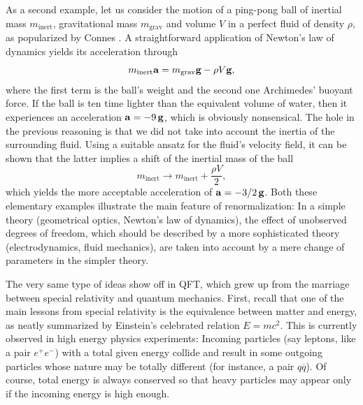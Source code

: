 \documentclass[10pt,here,feynmf]{article}
\begin{document}
As a second example, let us consider the motion of a ping-pong ball of inertial mass $m_{\mathrm{inert}}$, gravitational mass $m_{\mathrm{grav}}$ and volume $V$ in a perfect fluid of density $\rho$, as popularized by Connes \cite{connesmarcolli}. A straightforward application of Newton's law of dynamics yields its acceleration through 
\begin{equation} 
m_{\mathrm{inert}}{\bf a}=m_{\mathrm{grav}}{\bf g}-\rho V{\bf g},
\end{equation}
where the first term is the ball's weight and the second one Archimedes' buoyant force. If the ball is ten time lighter than the equivalent volume of water, then it experiences an acceleration ${\bf a}=-9\,{\bf g}$, which is obviously nonsensical. The hole in the previous reasoning is that we did not take into account the inertia of the surrounding fluid. Using a suitable ansatz for the fluid's velocity field, it can be shown \cite{connesmarcolli} that the latter implies a shift of the inertial mass of the ball 
\begin{equation}
m_{\mathrm{inert}}\rightarrow m_{\mathrm{inert}}+\frac{\rho V}{2},
\end{equation}
which yields the more acceptable acceleration of ${\bf a}=-3/2\,{\bf g}$.  Both these elementary examples illustrate the main feature of renormalization: In a simple theory (geometrical optics, Newton's law of dynamics), the effect of unobserved degrees of freedom, which should be described by a more sophisticated theory (electrodynamics, fluid mechanics), are taken into account by a mere change of parameters in the simpler theory.  

 
The very same type of ideas show off in QFT, which grew up from the marriage between special relativity and quantum mechanics. First, recall that one of the main lessons from special relativity is the equivalence between matter and energy, as neatly summarized by Einstein's celebrated relation $E=mc^{2}$. This is currently observed in high energy physics experiments: Incoming particles (say leptons, like a pair $e^{+}e^{-}$) with a total given energy collide and result in some outgoing particles whose nature may be totally different (for instance, a pair $q\overline{q}$).  Of course, total energy is always conserved so that heavy particles may appear only if the incoming energy is high enough.
     
\end{document}
